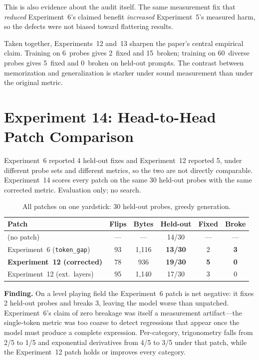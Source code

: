 \documentclass[11pt,a4paper]{article}
\begin{document}
This is also evidence about the audit itself. The same measurement fix that
\emph{reduced} Experiment~6's claimed benefit \emph{increased} Experiment~5's
measured harm, so the defects were not biased toward flattering results.

Taken together, Experiments~12 and~13 sharpen the paper's central empirical
claim. Training on 6~probes gives 2~fixed and 15~broken; training on 60~diverse
probes gives 5~fixed and 0~broken on held-out prompts. The contrast between
memorization and generalization is starker under sound measurement than under the
original metric.

\section{Experiment 14: Head-to-Head Patch Comparison}
\label{sec:exp14}

Experiment~6 reported 4 held-out fixes and Experiment~12 reported 5, under
different probe sets and different metrics, so the two are not directly
comparable. Experiment~14 scores every patch on the same 30 held-out probes with
the same corrected metric. Evaluation only; no search.

\begin{table}[h]
\centering
\caption{All patches on one yardstick: 30 held-out probes, greedy generation.}
\begin{tabular}{lccccc}
\toprule
Patch & Flips & Bytes & Held-out & Fixed & Broke \\
\midrule
(no patch) & --- & --- & 14/30 & --- & --- \\
Experiment~6 (\texttt{token\_gap}) & 93 & 1{,}116 & \textbf{13/30} & 2 & \textbf{3} \\
\textbf{Experiment~12 (corrected)} & 78 & 936 & \textbf{19/30} & \textbf{5} & \textbf{0} \\
Experiment~12 (ext.\ layers) & 95 & 1{,}140 & 17/30 & 3 & 0 \\
\bottomrule
\end{tabular}
\end{table}

\textbf{Finding.} On a level playing field the Experiment~6 patch is net
negative: it fixes 2 held-out probes and breaks 3, leaving the model worse than
unpatched. Experiment~6's claim of zero breakage was itself a measurement
artifact---the single-token metric was too coarse to detect regressions that
appear once the model must produce a complete expression. Per-category, trigonometry
falls from 2/5 to 1/5 and exponential derivatives from 4/5 to 3/5 under that patch,
while the Experiment~12 patch holds or improves every category.
\end{document}
